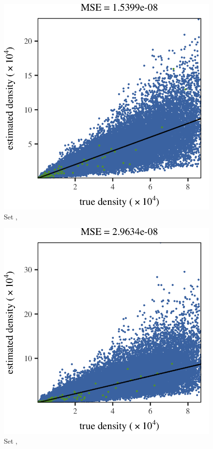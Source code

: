 \begin{subfigure}{0.3\textwidth}
	\centering
	\includegraphics[keepaspectratio=true, width=\textwidth, height=0.23\textheight]{result/img/results_baakman_1_60000_sambe_silverman}
	\caption{Set \baakmanOne, \sambe}
	\label{fig:results:singlesphere:sambe:baakman1}
\end{subfigure}
\begin{subfigure}{0.3\textwidth}
	\centering
	\includegraphics[keepaspectratio=true, width=\textwidth, height=0.23\textheight]{result/img/results_baakman_4_60000_sambe_silverman}
	\caption{Set \baakmanFour, \sambe}
	\label{fig:results:singlesphere:sambe:baakman4}
\end{subfigure}		
